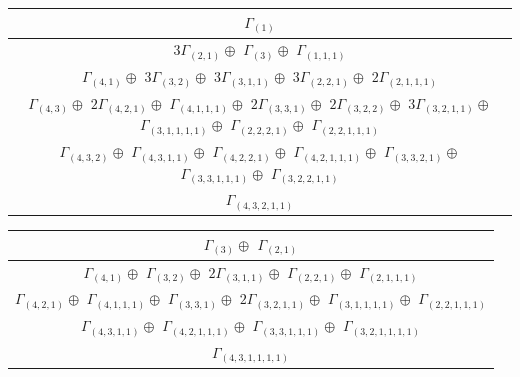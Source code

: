 \documentclass[main.tex]{subfiles}
\begin{document}
\begin{minipage}{1\textwidth}
\centering
\begin{tabular}{c}
$\Gamma_{(
1
)}$
\\ \hline
$3\Gamma_{(
2 , 
1
)} \oplus$
$\Gamma_{(
3
)} \oplus$
$\Gamma_{(
1 , 
1 , 
1
)}$
\\ \hline
$\Gamma_{(
4 , 
1
)} \oplus$
$3\Gamma_{(
3 , 
2
)} \oplus$
$3\Gamma_{(
3 , 
1 , 
1
)} \oplus$
$3\Gamma_{(
2 , 
2 , 
1
)} \oplus$
$2\Gamma_{(
2 , 
1 , 
1 , 
1
)} $
\\ \hline
$\Gamma_{(
4 , 
3
)} \oplus$
$2\Gamma_{(
4 , 
2 , 
1
)} \oplus$
$\Gamma_{(
4 , 
1 , 
1 , 
1
)} \oplus$
$2\Gamma_{(
3 , 
3 , 
1
)} \oplus$
$2\Gamma_{(
3 , 
2 , 
2
)} \oplus$
$3\Gamma_{(
3 , 
2 , 
1 , 
1
)} \oplus$
$\Gamma_{(
3 , 
1 , 
1 , 
1 , 
1
)} \oplus$
$\Gamma_{(
2 , 
2 , 
2 , 
1
)} \oplus$
$\Gamma_{(
2 , 
2 , 
1 , 
1 , 
1
)}$
\\ \hline
$\Gamma_{(
4 , 
3 , 
2
)} \oplus$
$\Gamma_{(
4 , 
3 , 
1 , 
1
)} \oplus$
$\Gamma_{(
4 , 
2 , 
2 , 
1
)} \oplus$
$\Gamma_{(
4 , 
2 , 
1 , 
1 , 
1
)} \oplus$
$\Gamma_{(
3 , 
3 , 
2 , 
1
)} \oplus$
$\Gamma_{(
3 , 
3 , 
1 , 
1 , 
1
)} \oplus$
$\Gamma_{(
3 , 
2 , 
2 , 
1 , 
1
)}$
\\ \hline
$\Gamma_{(
4 , 
3 , 
2 , 
1 , 
1
)}$
\\
\end{tabular}\end{minipage}
\bigskip
\begin{minipage}{1\textwidth}
\centering
\begin{tabular}{c}
$\Gamma_{(
3
)} \oplus$
$\Gamma_{(
2 , 
1
)}$
\\ \hline
$\Gamma_{(
4 , 
1
)} \oplus$
$\Gamma_{(
3 , 
2
)} \oplus$
$2\Gamma_{(
3 , 
1 , 
1
)} \oplus$
$\Gamma_{(
2 , 
2 , 
1
)} \oplus$
$\Gamma_{(
2 , 
1 , 
1 , 
1
)}$
\\ \hline
$\Gamma_{(
4 , 
2 , 
1
)} \oplus$
$\Gamma_{(
4 , 
1 , 
1 , 
1
)} \oplus$
$\Gamma_{(
3 , 
3 , 
1
)} \oplus$
$2\Gamma_{(
3 , 
2 , 
1 , 
1
)} \oplus$
$\Gamma_{(
3 , 
1 , 
1 , 
1 , 
1
)} \oplus$
$\Gamma_{(
2 , 
2 , 
1 , 
1 , 
1
)}$
\\ \hline
$\Gamma_{(
4 , 
3 , 
1 , 
1
)} \oplus$
$\Gamma_{(
4 , 
2 , 
1 , 
1 , 
1
)} \oplus$
$\Gamma_{(
3 , 
3 , 
1 , 
1 , 
1
)} \oplus$
$\Gamma_{(
3 , 
2 , 
1 , 
1 , 
1 , 
1
)}$
\\ \hline
$\Gamma_{(
4 , 
3 , 
1 , 
1 , 
1 , 
1
)}$
\\
\end{tabular}\end{minipage}
\bigskip
\end{document}
